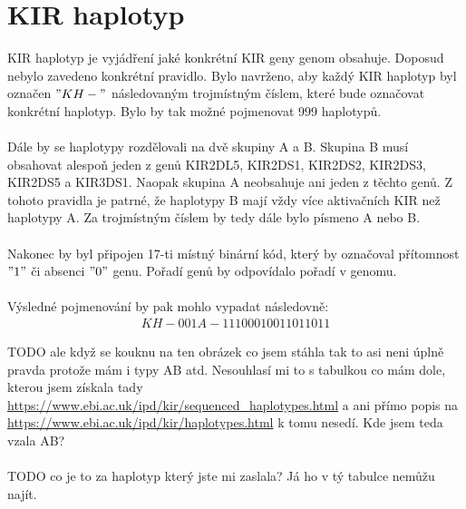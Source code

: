 \documentclass[czech,DP]{thesiskiv}
\begin{document}
\section{KIR haplotyp}
KIR haplotyp je vyjádření jaké konkrétní KIR geny genom obsahuje. Doposud nebylo zavedeno konkrétní pravidlo. Bylo navrženo, aby každý KIR haplotyp byl označen $"KH-"$ následovaným trojmístným číslem, které bude označovat konkrétní haplotyp. Bylo by tak možné pojmenovat 999 haplotypů. 
\\
\\
Dále by se haplotypy rozdělovali na dvě skupiny A a B. Skupina B musí obsahovat alespoň jeden z genů KIR2DL5, KIR2DS1, KIR2DS2, KIR2DS3, KIR2DS5 a KIR3DS1. Naopak skupina A neobsahuje ani jeden z těchto genů. Z tohoto pravidla je patrné, že haplotypy B mají vždy více aktivačních KIR než haplotypy A. Za trojmístným číslem by tedy dále bylo písmeno A nebo B.
\\
\\
Nakonec by byl připojen 17-ti místný binární kód, který by označoval přítomnost $"1"$ či absenci $"0"$ genu. Pořadí genů by odpovídalo pořadí v genomu.
\\
\\
Výsledné pojmenování by pak mohlo vypadat následovně:
\begin{align}
   \label{kir_haplotyp} KH-001A-11100010011011011
\end{align}

TODO ale když se kouknu na ten obrázek co jsem stáhla tak to asi neni úplně pravda protože mám i typy AB atd. Nesouhlasí mi to s tabulkou co mám dole, kterou jsem získala tady \url{https://www.ebi.ac.uk/ipd/kir/sequenced_haplotypes.html}
a ani přímo popis na \url{https://www.ebi.ac.uk/ipd/kir/haplotypes.html} k tomu nesedí. Kde jsem teda vzala AB?
\\
\\
TODO co je to za haplotyp který jste mi zaslala? Já ho v tý tabulce nemůžu najít.
\end{document}
